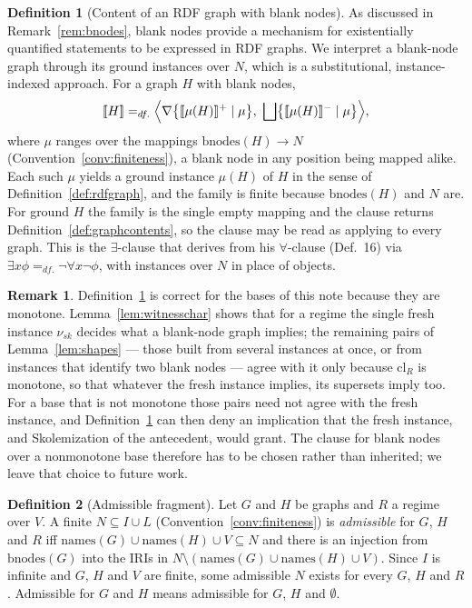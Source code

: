 \documentclass[12pt]{article}
\theoremstyle{definition}
\newtheorem{definition}{Definition}
\newtheorem{remark}{Remark}
\newcommand{\sem}[1]{\llbracket #1 \rrbracket}  %
\begin{document}
\begin{definition}[Content of an RDF graph with blank nodes]
\label{def:existential}
As discussed in Remark~\ref{rem:bnodes}, blank nodes provide a mechanism for existentially quantified statements to be expressed in RDF graphs. We interpret a blank-node graph through its ground instances over $N$, which is a substitutional, instance-indexed approach. For a graph $H$ with blank nodes,
\[
\sem{H} =_{df.} \Bigl\langle \nabla\bigl\{\sem{\mu(H)}^{+} \mid \mu\bigr\},\ \bigsqcup\bigl\{\sem{\mu(H)}^{-} \mid \mu\bigr\} \Bigr\rangle,
\]
where $\mu$ ranges over the mappings $\mathrm{bnodes}(H) \rightarrow N$ (Convention~\ref{conv:finiteness}), a blank node in any position being mapped alike. Each such $\mu$ yields a ground instance $\mu(H)$ of $H$ in the sense of Definition~\ref{def:rdfgraph}, and the family is finite because $\mathrm{bnodes}(H)$ and $N$ are. For ground $H$ the family is the single empty mapping and the clause returns Definition~\ref{def:graphcontents}, so the clause may be read as applying to every graph. This is the $\exists$-clause that \citet[p.~539]{hlobil2026firstorder} derives from his $\forall$-clause (Def.~16) via $\exists x\phi =_{df.} \neg\forall x\neg\phi$, with instances over $N$ in place of objects.
\end{definition}

\begin{remark}
\label{rem:existsmonotone}
Definition~\ref{def:existential} is correct for the bases of this note because they are monotone. Lemma~\ref{lem:witnesschar} shows that for a regime the single fresh instance $\nu_{sk}$ decides what a blank-node graph implies; the remaining pairs of Lemma~\ref{lem:shapes} --- those built from several instances at once, or from instances that identify two blank nodes --- agree with it only because $\mathrm{cl}_R$ is monotone, so that whatever the fresh instance implies, its supersets imply too. For a base that is not monotone those pairs need not agree with the fresh instance, and Definition~\ref{def:existential} can then deny an implication that the fresh instance, and Skolemization of the antecedent, would grant. The clause for blank nodes over a nonmonotone base therefore has to be chosen rather than inherited; we leave that choice to future work.
\end{remark}

\begin{definition}[Admissible fragment]
\label{def:admissible}
Let $G$ and $H$ be graphs and $R$ a regime over $V$. A finite $N \subseteq I \cup L$ (Convention~\ref{conv:finiteness}) is \textit{admissible} for $G$, $H$ and $R$ iff $\mathrm{names}(G) \cup \mathrm{names}(H) \cup V \subseteq N$ and there is an injection from $\mathrm{bnodes}(G)$ into the IRIs in $N \setminus (\mathrm{names}(G) \cup \mathrm{names}(H) \cup V)$. Since $I$ is infinite and $G$, $H$ and $V$ are finite, some admissible $N$ exists for every $G$, $H$ and $R$. Admissible for $G$ and $H$ means admissible for $G$, $H$ and $\emptyset$.
\end{definition}
\end{document}

